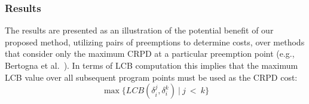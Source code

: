 \subsubsection{Results}
The results are presented as an illustration of the potential benefit of our proposed method, utilizing pairs of preemptions to determine costs, over methods that consider only the maximum CRPD at a particular preemption point (e.g., Bertogna et al.~\cite{bertogna:11}).
In terms of LCB computation this implies that the maximum LCB value over all subsequent program points must be used as the CRPD cost:
\begin{equation}
  \max\{LCB(\delta_i^j,\delta_i^k)\ \vert\ j\ <\ k\}
\end{equation}
%

